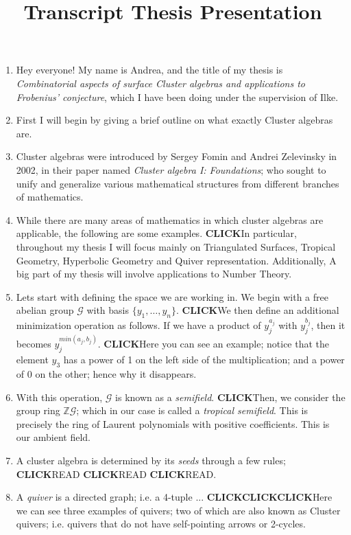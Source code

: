 \documentclass{article}
\title{Transcript Thesis Presentation}
\newcommand{\click}{\textbf{CLICK}}
\begin{document}
\maketitle

\begin{enumerate}
    \item Hey everyone! My name is Andrea, and the title of my thesis is \emph{Combinatorial aspects of surface Cluster algebras and applications to Frobenius' conjecture}, which I have been doing under the supervision of Ilke.
    \item First I will begin by giving a brief outline on what exactly Cluster algebras are.
    \item Cluster algebras were introduced by Sergey Fomin and Andrei Zelevinsky in 2002, in their paper named \emph{Cluster algebra I: Foundations}; who sought to unify and generalize various mathematical structures from different branches of mathematics. 
    \item While there are many areas of mathematics in which cluster algebras are applicable, the following are some examples. \click In particular, throughout my thesis I will focus mainly on Triangulated Surfaces, Tropical Geometry, Hyperbolic Geometry and Quiver representation. Additionally, A big part of my thesis will involve applications to Number Theory.
    \item Lets start with defining the space we are working in. We begin with a free abelian group $\mathcal{G}$ with basis $\{y_1,\dots,y_n\}$. \click We then define an additional minimization operation as follows. If we have a product of $y_j^{a_j}$ with $y_j^{b_j}$, then it becomes $y_j^{min(a_j,b_j)}$. \click Here you can see an example; notice that the element $y_3$ has a power of 1 on the left side of the multiplication; and a power of 0 on the other; hence why it disappears. 
    \item With this operation, $\mathcal{G}$ is known as a \emph{semifield}. \click Then, we consider the group  ring $\mathbb{Z}\mathcal{G}$; which in our case is called a \emph{tropical semifield}. This is precisely the ring of Laurent polynomials with positive coefficients. This is our ambient field. 
    \item A cluster algebra is determined by its \emph{seeds} through a few rules; \click READ \click READ \click READ. 
    \item A \emph{quiver} is a directed graph; i.e. a 4-tuple ... \click \click \click Here we can see three examples of quivers; two of which are also known as Cluster quivers; i.e. quivers that do not have self-pointing arrows or 2-cycles.

\end{enumerate}
\end{document}

